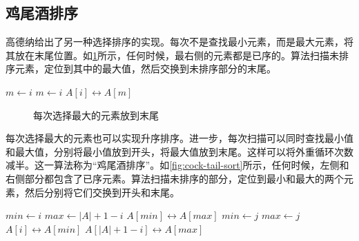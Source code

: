 \documentclass[b5paper]{ctexart}
\begin{document}
\subsection{鸡尾酒排序}

高德纳给出了另一种选择排序的实现\cite{TAOCP}。每次不是查找最小元素，而是最大元素，将其放在末尾位置。如\cref{fig:knuth-ssort}所示，任何时候，最右侧的元素都是已序的。算法扫描未排序元素，定位到其中的最大值，然后交换到未排序部分的末尾。

\begin{algorithmic}[1]
    \State $m \gets i$
        \State $m \gets i$
      \EndIf
    \EndFor
    \State {} $A[i] \leftrightarrow A[m]$
  \EndFor
\EndProcedure
\end{algorithmic}

\begin{figure}[htbp]
  \centering
  \caption{每次选择最大的元素放到末尾}
  \label{fig:knuth-ssort}
\end{figure}

每次选择最大的元素也可以实现升序排序。进一步，每次扫描可以同时查找最小值和最大值，分别将最小值放到开头，将最大值放到末尾。这样可以将外重循环次数减半。这一算法称为“鸡尾酒排序”。如\cref{fig:cock-tail-sort}所示，任何时候，左侧和右侧部分都包含了已序元素。算法扫描未排序的部分，定位到最小和最大的两个元素，然后分别将它们交换到开头和末尾。

\begin{algorithmic}[1]
    \State $min \gets i$
    \State $max \gets |A| + 1 - i$
      \State {} $A[min] \leftrightarrow A[max]$
    \EndIf
        \State $min \gets j$
      \EndIf
        \State $max \gets j$
      \EndIf
    \EndFor
    \State {} $A[i] \leftrightarrow A[min]$
    \State {} $A[|A|+1-i] \leftrightarrow A[max]$
  \EndFor
\EndProcedure
\end{algorithmic}
\end{document}
